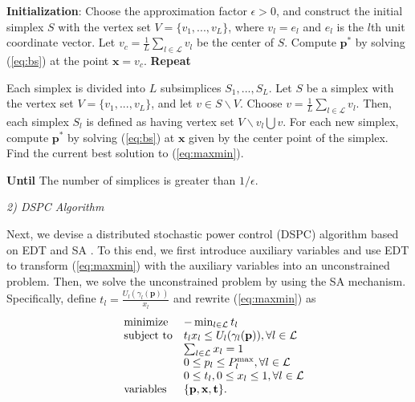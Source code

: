 \documentclass[10pt,journal,letterpaper,compsoc]{IEEEtran}
\begin{document}
{\begin{algorithm}
\caption{}
\label{alg:bsa}
\begin{algorithmic}
\STATE \textbf{Initialization}: Choose the approximation factor $\epsilon>0$, and construct the initial simplex $S$ with the vertex set $V=\{v_1,...,v_L\}$, where $v_l=e_l$ and $e_l$ is the $l$th unit coordinate vector. Let $v_c=\frac{1}{L}\sum_{l\in\mathcal{L}}v_l$ be the center of $S$. Compute $\mathbf{p^*}$  by solving (\ref{eq:bs}) at the point $\mathbf{x} = v_c$. \STATE \textbf{Repeat}
\begin{enumerate}
\STATE Each simplex is divided into $L$ subsimplices $S_1,...,S_L$. Let $S$ be a simplex with the vertex set $V=\{v_1,...,v_L\}$, and let $v\in S\backslash V$. Choose $v=\frac{1}{L}\sum_{l\in\mathcal{L}}v_l$. Then, each simplex $S_l$ is defined as having vertex set $V\backslash v_l\bigcup v$.
\STATE For each new simplex, compute $\mathbf{p^*}$ by solving (\ref{eq:bs}) at $\mathbf{x}$ given by the center point of the simplex.
\STATE Find the current best solution to (\ref{eq:maxmin}).
\end{enumerate}
\STATE \textbf{Until} The number of simplices is greater than $1/{\epsilon}$.
\end{algorithmic}
\end{algorithm}

\noindent
{\emph{2) DSPC Algorithm}

Next, we devise a distributed stochastic power control (DSPC) algorithm based on EDT \cite{chen:2008} and SA \cite{Kirkpatrick:1983}. To this end, we first introduce auxiliary variables and use EDT to transform (\ref{eq:maxmin}) with the auxiliary variables into an unconstrained problem. Then, we solve the unconstrained problem by using the SA mechanism. Specifically, define $t_l=\frac{U_l(\gamma_l(\mathbf{p}))}{x_l}$ and rewrite (\ref{eq:maxmin}) as
\begin{equation}\begin{array}
[c]{lll}&{\text{minimize} }& -\min_{l\in\mathcal{L}}t_l
\\
&\text{subject to}& t_lx_l\le U_l(\gamma_l(\mathbf{p})), \forall l\in\mathcal{L}
\\
&& \sum_{l\in\mathcal{L}} x_l =1
\\
&& 0\leq p_l\leq P_l^{\max}, \forall l\in\mathcal{L}
\\
&& 0\le t_l, 0\leq x_l\leq 1, \forall l\in\mathcal{L}
\\
& \text{variables}& \{\mathbf{p},\mathbf{x},\mathbf{t}\}.
\end{array}
\label{eq:maxmin2}
\end{equation}

}}
\end{document}
